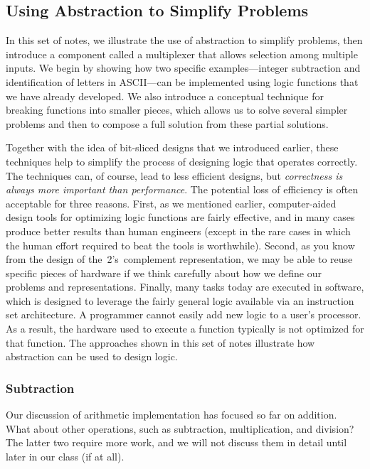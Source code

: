 \classtitle

\subsection{Using Abstraction to Simplify Problems}

In this set of notes, we illustrate the use of abstraction to simplify
problems, then introduce a component called a multiplexer that allows
selection among multiple inputs.
%
We begin by showing how two specific 
examples---integer subtraction and identification of letters
in ASCII---can be implemented using logic functions that we have already
developed.  We also introduce a conceptual technique for
breaking functions into smaller pieces, which allows us to solve
several simpler problems and then to compose a full solution from 
these partial solutions.

Together with the idea of bit-sliced designs that we introduced earlier,
these techniques help to simplify the process of designing logic that
operates correctly.  The techniques can, of course, lead to 
less efficient designs,
but {\em correctness is always more important than performance}.
%
The potential loss of efficiency is often acceptable for three reasons.
%
First, as we mentioned earlier, computer-aided design tools for 
optimizing logic functions are fairly effective, and in many cases
produce better results than human engineers (except in the rare cases 
in which the human effort required to beat the tools is worthwhile).
%
Second, as you know from the design of the~\mbox{2's complement} 
representation, we may be able to reuse specific pieces of hardware if
we think carefully about how we define our problems and representations.
%
Finally, many tasks today are executed in software, which is designed
to leverage the fairly general logic available via an instruction set
architecture.  A programmer cannot easily add new logic to a user's
processor.  As a result, the hardware used to execute a
function typically is not optimized for that function.
%
The approaches shown in this set of notes illustrate how abstraction
can be used to design logic.\\

\subsubsection{Subtraction}

Our discussion of arithmetic implementation has focused so far on 
addition.  What about other operations, such as subtraction, multiplication,
and division?  The latter two require more work, and we will not
discuss them in detail until later in our class (if at all).

